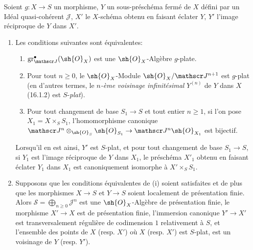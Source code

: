 \begin{proposition}[19.4.6]
\label{IV.19.4.6}
Soient $g:X\to S$ un morphisme, $Y$ un sous-préschéma fermé de $X$ défini par un Idéal quasi-cohérent $\mathscr J$, $X'$ le $X$-schéma obtenu en faisant éclater $Y$, $Y'$ l'image réciproque de $Y$ dans $X'$.
\begin{enumerate}
  \item[\textup{(i)}] Les conditions suivantes sont équivalentes:
  \begin{enumerate}
    \item[\textup{a)}] $\operatorname{gr}_{\mathscr J}^\bullet(\sh{O}_X)$ est une $\sh{O}_X$-Algèbre $g$-plate.
    \item[\textup{b)}] Pour tout $n\geq0$, le $\sh{O}_X$-Module $\sh{O}_X/\mathscr J^{n+1}$ est $g$-plat \textup{(en d'autres termes, le \emph{$n$-ème voisinage infinitésimal} $Y^{(n)}$ de $Y$ dans $X$ (16.1.2) est $S$-\emph{plat})}.
    \item[\textup{c)}] Pour tout changement de base $S_1\to S$ et tout entier $n\geq1$, si l'on pose $X_1=X\times_S S_1$, l'homomorphisme canonique $\mathscr J^n\otimes_{\sh{O}_S}\sh{O}_{S_1}\to\mathscr J^n\sh{O}_{X_1}$ est bijectif.
  \end{enumerate}

  Lorsqu'il en est ainsi, $Y'$ est $S$-plat, et pour tout changement de base $S_1\to S$, si $Y_1$ est l'image réciproque de $Y$ dans $X_1$, le préschéma $X'_1$ obtenu en faisant éclater $Y_1$ dans $X_1$ est canoniquement isomorphe à $X'\times_S S_1$.
  \item[\textup{(ii)}] Supposons que les conditions équivalentes de \textup{(i)} soient satisfaites et de plus que les morphismes $X\to S$ et $Y\to S$ soient localement de présentation finie. Alors $\mathscr S=\bigoplus_{n\geq0}\mathscr J^n$ est une $\sh{O}_X$-Algèbre de présentation finie, le morphisme $X'\to X$ est de présentation finie, l'immersion canonique $Y'\to X'$ est transversalement régulière de codimension $1$ relativement à $S$, et l'ensemble des points de $X$ \textup{(resp. $X'$)} où $X$ \textup{(resp. $X'$)} est $S$-plat, est un voisinage de $Y$ \textup{(resp. $Y'$)}.
\end{enumerate}
\end{proposition}

